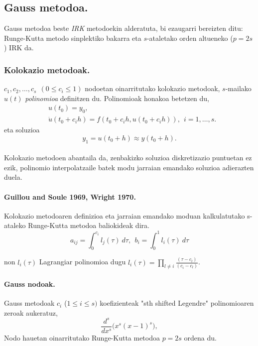 \subsection{Gauss metodoa.}

Gauss metodoa beste \emph{IRK} metodoekin alderatuta, bi ezaugarri bereizten ditu:  Runge-Kutta metodo sinplektiko bakarra eta $s$-ataletako orden altueneko ($p=2s$) IRK da. 

\subsubsection*{Kolokazio metodoak.}

$c_1,c_2,\dots,c_s \ \ (0\leq c_i \leq 1)$ nodoetan oinarritutako kolokazio metodoak, $s$-mailako $u(t)$  \emph{polinomioa} definitzen du. Polinomioak honakoa betetzen du,
\begin{align*}
&u(t_0) =y_0, \\
&\dot{u}(t_0+c_ih) =f(t_0+c_i h, u(t_0+c_i h)), \ \ i=1,\dots,s.
\end{align*}
eta soluzioa 
\begin{equation*}
y_1=u(t_0+h)\approx y(t_0+h).
\end{equation*} 

\paragraph*{}Kolokazio metodoen abantaila da, zenbakizko soluzioa diskretizazio puntuetan ez ezik, polinomio interpolatzaile batek modu jarraian emandako soluzioa adierazten duela. 

\paragraph*{Guillou and Soule 1969, Wright 1970.}
Kolokazio metodoaren definizioa eta jarraian emandako moduan kalkulatutako s-ataleko Runge-Kutta metodoa baliokideak dira.
\begin{equation}
a_{ij}=\int_{0}^{c_i} l_j(\tau) \ d\tau, \ \ b_i=\int_{0}^{1} l_i(\tau) \ d\tau
\end{equation}

non $l_i(\tau)$ Lagrangiar polinomioa dugu $l_i(\tau)=\prod_{l\neq i} \frac{(\tau-c_l)}{(c_i-c_l)}$.


\paragraph*{Gauss nodoak.} Gauss metodoak $c_i$ ($1 \leq i \leq s)$ koefizienteak "sth shifted Legendre" polinomioaren zeroak aukeratuz,
\begin{equation*}
\frac{d^s}{dx^s} \big(x^s(x-1)^s \big),
\end{equation*} 
Nodo hauetan oinarritutako Runge-Kutta metodoa $p=2s$ ordena du.

